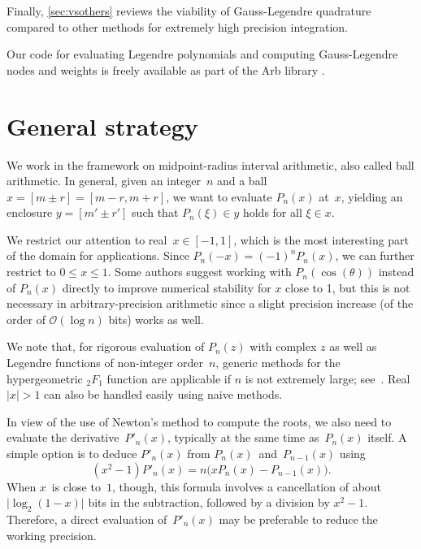 \documentclass[nohypdvips,review]{siamart0216}
\newcommand{\abs}[1]{\mathopen| #1 \mathclose|}
\newcommand{\OO}{\mathcal{O}}
\begin{document}
Finally, \cref{sec:vsothers} reviews the viability of Gauss-Legendre
quadrature compared to other methods
for extremely high precision integration.

Our code for evaluating Legendre polynomials and computing
Gauss-Legendre nodes and weights is freely available as part of
the Arb library \cite{Johansson2017arb}.

\section{General strategy}

\label{sec:general}

We work in the framework on midpoint-radius interval arithmetic,
also called ball arithmetic.
In general, given an integer~$n$ and a ball $x = [m \pm r] = [m-r, m+r]$,
we want to evaluate $P_n(x)$ at~$x$,
yielding an enclosure $y = [m' \pm r']$ such that $P_n(\xi) \in y$
holds for all $\xi \in x$.

We restrict our attention to real~$x \in [-1, 1]$,
which is the most interesting part of the domain for applications.
Since $P_n(-x) = (-1)^n P_n(x)$, we can further
restrict to $0 \le x \le 1$.
Some authors suggest working with $P_n(\cos(\theta))$ instead of $P_n(x)$
directly to improve numerical stability for $x$ close to 1, but
this is not necessary in arbitrary-precision arithmetic since
a slight precision increase (of the order of $\OO(\log n)$ bits)
works as well.

We note that, for rigorous evaluation of $P_n(z)$ with complex $z$
as well as Legendre functions of non-integer order $n$,
generic methods for the hypergeometric ${}_2F_1$ function
are applicable if $n$ is not extremely large; see~\cite{johansson2016hypergeometric}.
Real $|x| > 1$ can also be handled easily using naive methods.

In view of the use of Newton's method to compute the roots,
we also need to evaluate the derivative $P'_n(x)$,
typically at the same time as $P_n(x)$ itself.
A simple option is to deduce $P'_n(x)$ from
$P_n(x)$ and $P_{n-1}(x)$ using
\begin{equation} \label{eq:mixed}
  (x^2 - 1) P'_n(x) = n \bigl( x P_n(x) - P_{n-1}(x) \bigl).
\end{equation}
When $x$ is close to~$1$, though, this formula involves a
cancellation of about $\abs{\log_2(1 - x)}$ bits in the subtraction,
followed by a division by $x^2 - 1$. Therefore, a direct evaluation
of $P'_n(x)$ may be preferable to reduce the working precision.
\end{document}
